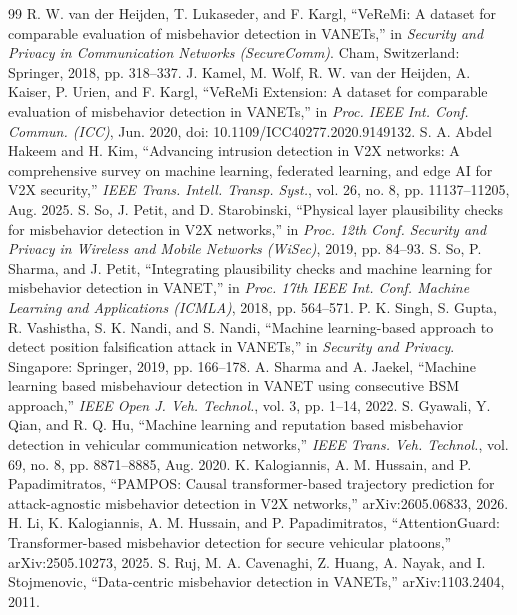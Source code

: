 \documentclass[conference]{IEEEtran}
\begin{document}
\begin{thebibliography}{99}
 R. W. van der Heijden, T. Lukaseder, and F. Kargl, ``VeReMi: A dataset for comparable evaluation of misbehavior detection in VANETs,'' in \emph{Security and Privacy in Communication Networks (SecureComm)}. Cham, Switzerland: Springer, 2018, pp. 318--337.
 J. Kamel, M. Wolf, R. W. van der Heijden, A. Kaiser, P. Urien, and F. Kargl, ``VeReMi Extension: A dataset for comparable evaluation of misbehavior detection in VANETs,'' in \emph{Proc. IEEE Int. Conf. Commun. (ICC)}, Jun. 2020, doi: 10.1109/ICC40277.2020.9149132.
 S. A. Abdel Hakeem and H. Kim, ``Advancing intrusion detection in V2X networks: A comprehensive survey on machine learning, federated learning, and edge AI for V2X security,'' \emph{IEEE Trans. Intell. Transp. Syst.}, vol. 26, no. 8, pp. 11137--11205, Aug. 2025.
 S. So, J. Petit, and D. Starobinski, ``Physical layer plausibility checks for misbehavior detection in V2X networks,'' in \emph{Proc. 12th Conf. Security and Privacy in Wireless and Mobile Networks (WiSec)}, 2019, pp. 84--93.
 S. So, P. Sharma, and J. Petit, ``Integrating plausibility checks and machine learning for misbehavior detection in VANET,'' in \emph{Proc. 17th IEEE Int. Conf. Machine Learning and Applications (ICMLA)}, 2018, pp. 564--571.
 P. K. Singh, S. Gupta, R. Vashistha, S. K. Nandi, and S. Nandi, ``Machine learning-based approach to detect position falsification attack in VANETs,'' in \emph{Security and Privacy}. Singapore: Springer, 2019, pp. 166--178.
 A. Sharma and A. Jaekel, ``Machine learning based misbehaviour detection in VANET using consecutive BSM approach,'' \emph{IEEE Open J. Veh. Technol.}, vol. 3, pp. 1--14, 2022.
 S. Gyawali, Y. Qian, and R. Q. Hu, ``Machine learning and reputation based misbehavior detection in vehicular communication networks,'' \emph{IEEE Trans. Veh. Technol.}, vol. 69, no. 8, pp. 8871--8885, Aug. 2020.
 K. Kalogiannis, A. M. Hussain, and P. Papadimitratos, ``PAMPOS: Causal transformer-based trajectory prediction for attack-agnostic misbehavior detection in V2X networks,'' arXiv:2605.06833, 2026.
 H. Li, K. Kalogiannis, A. M. Hussain, and P. Papadimitratos, ``AttentionGuard: Transformer-based misbehavior detection for secure vehicular platoons,'' arXiv:2505.10273, 2025.
 S. Ruj, M. A. Cavenaghi, Z. Huang, A. Nayak, and I. Stojmenovic, ``Data-centric misbehavior detection in VANETs,'' arXiv:1103.2404, 2011.

\end{thebibliography}
\end{document}
